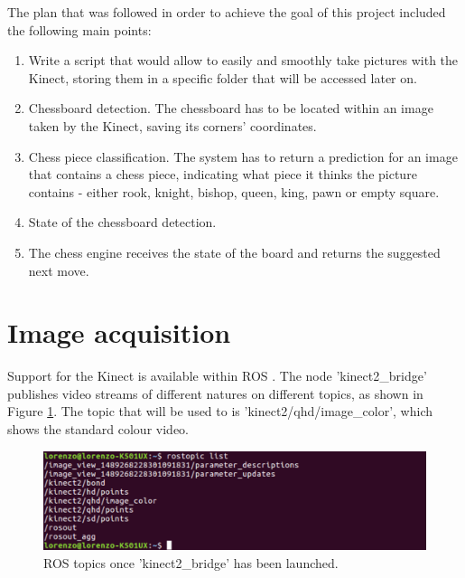 \documentclass{l4proj}
\begin{document}
The plan that was followed in order to achieve the goal of this project included the following main points:


\begin{enumerate}

	\item Write a script that would allow to easily and smoothly take pictures with the Kinect, storing them in a specific folder that will be accessed later on.


	\item Chessboard detection. The chessboard has to be located within an image taken by the Kinect, saving its corners' coordinates.


	\item Chess piece classification. The system has to return a prediction for an image that contains a chess piece, indicating what piece it thinks the picture contains - either rook, knight, bishop, queen, king, pawn or empty square.

	\item State of the chessboard detection.

	\item The chess engine receives the state of the board and returns the suggested next move.

\end{enumerate}


\section{Image acquisition}

Support for the Kinect is available within ROS \cite{iai_kinect2}. The node 'kinect2\_bridge' publishes video streams of different natures on different topics, as shown in Figure \ref{Kinect2_bridge}. The topic that will be used to is 'kinect2/qhd/image\_color', which shows the standard colour video.

\begin{figure}[h!]
\centering
\includegraphics[scale=0.47]{kinect2_bridge.png}
\caption{ROS topics once 'kinect2\_bridge' has been launched.}
\label{Kinect2_bridge}
\end{figure}
\end{document}
